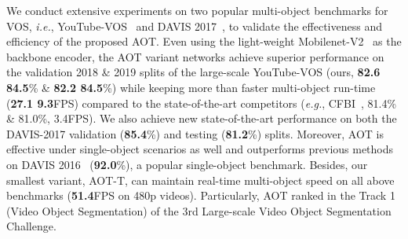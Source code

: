 \documentclass{article}
\def\eg{\emph{e.g.}}
\def\ie{\emph{i.e.}}
\begin{document}
We conduct extensive experiments on two popular multi-object benchmarks for VOS, \ie, YouTube-VOS~\cite{youtubevos} and DAVIS 2017~\cite{davis2017}, to validate the effectiveness and efficiency of the proposed AOT. {Even using the light-weight Mobilenet-V2~\cite{sandler2018mobilenetv2} as the backbone encoder}, the AOT variant networks achieve superior performance on the validation 2018 \& 2019 splits of the large-scale YouTube-VOS (ours,  \textbf{82.6 84.5}\% \& \textbf{82.2 84.5}\%) while keeping more than  faster multi-object run-time (\textbf{27.1 9.3}FPS) compared to the state-of-the-art competitors (\eg, CFBI~\cite{cfbi}, 81.4\% \& 81.0\%, 3.4FPS). We also achieve new state-of-the-art performance on both the DAVIS-2017 validation (\textbf{85.4}\%) and testing (\textbf{81.2}\%) splits. Moreover, AOT is effective under single-object scenarios as well and outperforms previous methods on DAVIS 2016~\cite{davis2016} (\textbf{92.0}\%), a popular single-object benchmark. Besides, our smallest variant, AOT-T, can maintain real-time multi-object speed on all above benchmarks (\textbf{51.4}FPS on 480p videos). Particularly, AOT ranked  in the Track 1 (Video Object Segmentation) of the 3rd Large-scale Video Object Segmentation Challenge.
\end{document}
